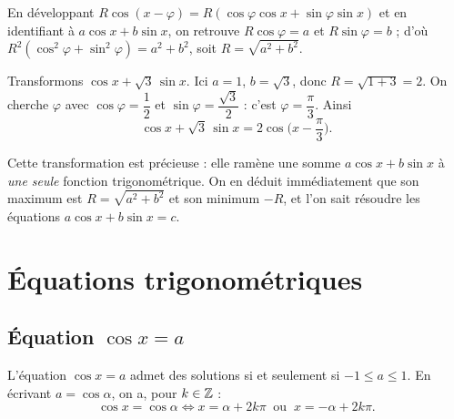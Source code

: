 \begin{exemple}
En développant $R\cos(x-\varphi)=R(\cos\varphi\cos x+\sin\varphi\sin x)$ et en
identifiant à $a\cos x+b\sin x$, on retrouve $R\cos\varphi=a$ et $R\sin\varphi=b$ ;
d'où $R^2(\cos^2\varphi+\sin^2\varphi)=a^2+b^2$, soit $R=\sqrt{a^2+b^2}$.
\end{exemple}

\begin{exemple}
Transformons $\cos x+\sqrt3\,\sin x$. Ici $a=1$, $b=\sqrt3$, donc
$R=\sqrt{1+3}=2$. On cherche $\varphi$ avec $\cos\varphi=\dfrac12$ et
$\sin\varphi=\dfrac{\sqrt3}{2}$ : c'est $\varphi=\dfrac{\pi}{3}$. Ainsi
\[
  \cos x+\sqrt3\,\sin x=2\cos\!\Big(x-\frac{\pi}{3}\Big).
\]
\end{exemple}

\begin{aretenir}
Cette transformation est précieuse : elle ramène une somme $a\cos x+b\sin x$ à
\emph{une seule} fonction trigonométrique. On en déduit immédiatement que son
maximum est $R=\sqrt{a^2+b^2}$ et son minimum $-R$, et l'on sait résoudre les
équations $a\cos x+b\sin x=c$.
\end{aretenir}

\section{Équations trigonométriques}

\subsection{Équation $\cos x=a$}

\begin{theoreme}[Résolution de $\cos x=\cos\alpha$]
L'équation $\cos x=a$ admet des solutions si et seulement si $-1\le a\le 1$. En
écrivant $a=\cos\alpha$, on a, pour $k\in\mathbb{Z}$ :
\[
  \cos x=\cos\alpha \iff x=\alpha+2k\pi \ \text{ ou }\ x=-\alpha+2k\pi.
\]
\end{theoreme}

\begin{illus}
\end{illus}

